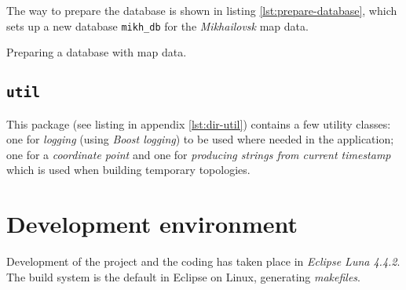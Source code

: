 \documentclass[../main.tex]{subfiles}
\begin{document}
The way to prepare the database is shown in listing \ref{lst:prepare-database}, which sets up a new database \texttt{mikh\_db} for the \textit{Mikhailovsk} map data.

\begin{mylisting}
\caption{Preparing a database with map data.}
\label{lst:prepare-database}
\end{mylisting}


\subsection{\texttt{util}}
This package (see listing in appendix \ref{lst:dir-util}) contains a few utility classes: one for \textit{logging} (using \textit{Boost logging}) to be used where needed in the application; one for a \textit{coordinate point} and one for \textit{producing strings from current timestamp} which is used when building temporary topologies.

\section{Development environment}
Development of the project and the coding has taken place in \textit{Eclipse Luna 4.4.2}. The build system is the default in Eclipse on Linux, generating \textit{makefiles}.
\end{document}

